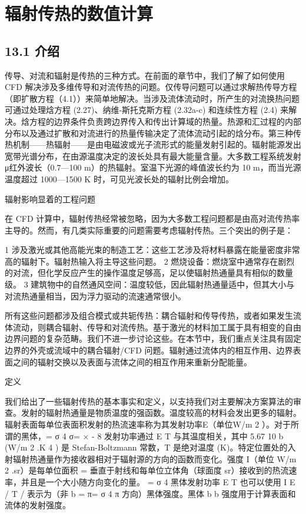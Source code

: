 \documentclass[11pt,a4paper,openany,fontset=none]{ctexbook}
\begin{document}
\chapter{辐射传热的数值计算}

\section*{13.1 介绍}

传导、对流和辐射是传热的三种方式。在前面的章节中，我们了解了如何使用 CFD 解决涉及多维传导和对流传热的问题。仅传导问题可以通过求解热传导方程（即扩散方程（4.1））来简单地解决。当涉及流体流动时，所产生的对流换热问题可通过处理焓方程 (2.27)、纳维-斯托克斯方程 (2.32a-c) 和连续性方程 (2.4) 来解决。焓方程的边界条件负责跨边界传入和传出计算域的热量。热源和汇过程的内部分布以及通过扩散和对流进行的热量传输决定了流体流动引起的焓分布。第三种传热机制——热辐射——是由电磁波或光子流形式的能量发射引起的。辐射能源发出宽带光谱分布，在由源温度决定的波长处具有最大能量含量。大多数工程系统发射μ红外波长（0.7—100 m）的热辐射。室温下光源的峰值波长约为 10 m，而当光源温度超过 1000—1500 K 时，可见光波长处的辐射比例会增加。

辐射影响显着的工程问题

在 CFD 计算中，辐射传热经常被忽略，因为大多数工程问题都是由高对流传热率主导的。然而，有几类实际重要的问题需要考虑辐射传热。三个突出的例子是：

1 涉及激光或其他高能光束的制造工艺：这些工艺涉及将材料暴露在能量密度非常高的辐射下。辐射热输入将主导这些问题。 2 燃烧设备：燃烧室中通常存在剧烈的对流，但化学反应产生的操作温度足够高，足以使辐射热通量具有相似的数量级。 3 建筑物中的自然通风空间：温度较低，因此辐射热通量适中，但其大小与对流热通量相当，因为浮力驱动的流速通常很小。

所有这些问题都涉及组合模式或共轭传热：耦合辐射和传导传热，或者如果发生流体流动，则耦合辐射、传导和对流传热。基于激光的材料加工属于具有相变的自由边界问题的复杂范畴。我们不进一步讨论这些。在本节中，我们重点关注具有固定边界的外壳或流域中的耦合辐射/CFD 问题。辐射通过流体内的相互作用、边界表面之间的辐射交换以及表面与流体之间的相互作用来重新分配能量。

定义

我们给出了一些辐射传热的基本事实和定义，以支持我们对主要解决方案算法的审查。发射的辐射热通量是物质温度的强函数。温度较高的材料会发出更多的辐射。辐射表面每单位表面积发射的热流速率称为其发射功率E（单位W/m 2 ）。对于所谓的黑体，= σ 4 σ= × - 8 发射功率通过 E T 与其温度相关，其中 5.67 10 b (W/m 2 .K 4 ) 是 Stefan-Boltzmann 常数，T 是绝对温度 (K)。特定位置处的入射辐射热通量作为接收器相对于辐射源的方向的函数而变化。强度 I（单位 W/m 2 .sr）是每单位面积 = 垂直于射线和每单位立体角（球面度 sr）接收到的热流速率，并且是一个大小随方向变化的量。 = σ 4 黑体发射功率 E T 也可以使用 I E / T / 表示为（非 b = π= σ 4 π 方向）黑体强度。黑体 b b 强度用于计算表面和流体的发射强度。
\end{document}
